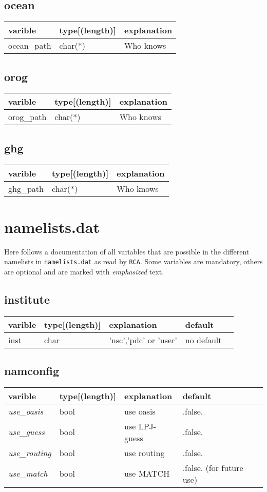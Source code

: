 \documentclass{article}
\begin{document}
\subsection{ocean}
\begin{tabular}{|l|l|l|}
  \hline
  varible & type[(length)] & explanation \\
  \hline
  \hline
  ocean\_path & char(*) & Who knows \\
 \hline
\end{tabular}

\subsection{orog}
\begin{tabular}{|l|l|l|}
  \hline
  varible & type[(length)] & explanation \\
  \hline
  \hline
  orog\_path & char(*) & Who knows \\
 \hline
\end{tabular}

\subsection{ghg}
\begin{tabular}{|l|l|l|}
  \hline
  varible & type[(length)] & explanation \\
  \hline
  \hline
  ghg\_path & char(*) & Who knows \\
 \hline
\end{tabular}
\section{namelists.dat}
\label{sec:namelist}

Here follows a documentation of all variables that are possible in
the different namelists in \verb+namelists.dat+ as read by \verb+RCA+. Some variables are
mandatory, others are optional and are marked with \emph{emphasized} text.
\subsection{institute}
\begin{tabular}{|l|l|l|l|l|}
  \hline
  varible & type[(length)] & explanation & default \\
  \hline
  \hline
  inst & char & 'nsc','pdc' or 'user' & no default \\
  \hline
\end{tabular}
\subsection{namconfig}
\begin{tabular}{|l|l|l|l|l|}
  \hline
  varible & type[(length)] & explanation & default \\
  \hline
  \hline
  \emph{use\_oasis} & bool & use oasis & .false.\\
  \emph{use\_guess} & bool & use LPJ-guess & .false. \\
  \emph{use\_routing} & bool & use routing & .false. \\
  \emph{use\_match} & bool & use MATCH & .false. (for future use) \\
  \hline
\end{tabular}
\end{document}
